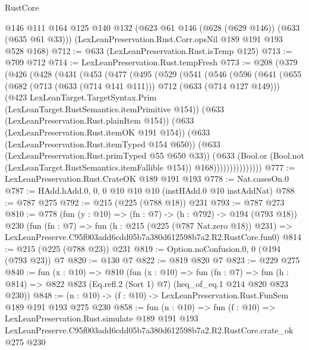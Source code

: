 \begin{lexlean}{RustCore}
\begin{coremodule}
    @146
    @111
    @164
    @125
    @140
    @132
    (@623 @61 @146 (@628 (@629 @146)) (@633 (@635 @61 @33)))
    (LexLeanPreservation.Rust.Corr.opsNil @189 @191 @193 @528 @168)
@712 := @633 (LexLeanPreservation.Rust.isTemp @125)
@713 := @709 @712
@714 := LexLeanPreservation.Rust.tempFresh
@773 := @208
    (@379
      (@426
        (@428
          (@431
            (@453
              (@477
                (@495
                  (@529
                    (@541
                      (@546
                        (@596
                          (@641
                            (@655
                              (@682 (@713 (@633 (@714 @141 @111))) @712 (@633 (@714 @127 @149)))
                              (@423
                                LexLeanTarget.TargetSyntax.Prim
                                (LexLeanTarget.RustSemantics.itemPrimitive @154))
                              (@633 (LexLeanPreservation.Rust.plainItem @154))
                              (@633 (LexLeanPreservation.Rust.itemOK @191 @154))
                              (@633 (LexLeanPreservation.Rust.itemTyped @154 @650))
                              (@633 (LexLeanPreservation.Rust.primTyped @55 @650 @33))
                              (@633
                                (Bool.or
                                  (Bool.not (LexLeanTarget.RustSemantics.itemFallible @154))
                                  @168)))))))))))))))
@777 := LexLeanPreservation.Rust.CrateOK @189 @191 @193
@778 := Nat.casesOn.{0}
@787 := HAdd.hAdd.{0, 0, 0} @10 @10 @10 (instHAdd.{0} @10 instAddNat)
@788 := @787 @275
@792 := @215 (@225 (@788 @18)) @231
@793 := @787 @273
@810 := @778
    (fun (y : @10) => (fn : @7) -> (h : @792) -> @194 (@793 @18))
    @230
    (fun (fn : @7) =>
    fun (h : @215 (@225 (@787 Nat.zero @18)) @231) =>
    LexLeanPreserve.C95f003add6cdd05b7a380d612598b7a2.R2.RustCore.fun0)
@814 := @215 (@225 (@788 @23)) @231
@819 := Option.noConfusion.{0, 0} (@194 (@793 @23)) @7
@820 := @130 @7
@822 := @819 @820 @7
@823 := @229 @275
@840 := fun (x : @10) =>
  @810
    (fun (x : @10) =>
    fun (fn : @7) =>
    fun (h : @814) => @822 @823 (Eq.refl.{2} (Sort 1) @7) (heq_of_eq.{1} @214 @820 @823 @230))
@848 := (n : @10) -> (f : @10) -> LexLeanPreservation.Rust.FunSem @189 @191 @193 @275 @230
@858 := fun (n : @10) =>
  fun (f : @10) =>
  LexLeanPreservation.Rust.simulate
    @189
    @191
    @193
    LexLeanPreserve.C95f003add6cdd05b7a380d612598b7a2.R2.RustCore.crate_ok
    @275
    @230
\end{coremodule}
\end{lexlean}
